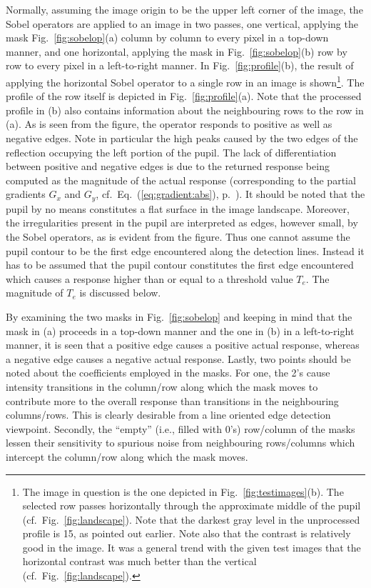 Normally, assuming the image origin to be the upper left corner of the
image, the Sobel operators are applied to an image in two passes, one
vertical, applying the mask Fig.~\ref{fig:sobelop}(a) column by column
to every pixel in a top-down manner, and one horizontal, applying the
mask in Fig.~\ref{fig:sobelop}(b) row by row to every pixel in a
left-to-right manner.  In Fig.~\ref{fig:profile}(b), the result of
applying the horizontal Sobel operator to a single row in an image is
shown\footnote{The image in question is the one depicted in
  Fig.~\ref{fig:testimages}(b).  The selected row passes horizontally
  through the approximate middle of the pupil (cf.\ 
  Fig.~\ref{fig:landscape}).  Note that the darkest gray level in the
  unprocessed profile is 15, as pointed out earlier.  Note also that
  the contrast is relatively good in the image.  It was a general
  trend with the given test images that the horizontal contrast was
  much better than the vertical (cf.\ Fig.~\ref{fig:landscape}).}.
The profile of the row itself is depicted in
Fig.~\ref{fig:profile}(a).  Note that the processed profile in (b)
also contains information about the neighbouring rows to the row in
(a).  As is seen from the figure, the operator responds to positive as
well as negative edges.  Note in particular the high peaks caused by
the two edges of the reflection occupying the left portion of the
pupil.  The lack of differentiation between positive and negative
edges is due to the returned response being computed as the magnitude
of the actual response (corresponding to the partial gradients $G_{x}$
and $G_{y}$, cf.\ Eq.~(\ref{eq:gradient:abs}),
p.~\pageref{eq:gradient:abs}).  It should be noted that the pupil by
no means constitutes a flat surface in the image landscape.  Moreover,
the irregularities present in the pupil are interpreted as edges,
however small, by the Sobel operators, as is evident from the figure.
Thus one cannot assume the pupil contour to be the first edge
encountered along the detection lines.  Instead it has to be assumed
that the pupil contour constitutes the first edge encountered which
causes a response higher than or equal to a threshold value $T_{e}$.
The magnitude of $T_{e}$ is discussed below.

By examining the two masks in Fig.~\ref{fig:sobelop} and keeping in
mind that the mask in (a) proceeds in a top-down manner and the one in
(b) in a left-to-right manner, it is seen that a positive edge causes
a positive actual response, whereas a negative edge causes a negative
actual response.  Lastly, two points should be noted about the
coefficients employed in the masks.  For one, the 2's cause intensity
transitions in the column/row along which the mask moves to contribute
more to the overall response than transitions in the neighbouring
columns/rows.  This is clearly desirable from a line oriented edge
detection viewpoint.  Secondly, the ``empty'' (i.e., filled with 0's)
row/column of the masks lessen their sensitivity to spurious noise
from neighbouring rows/columns which intercept the column/row along
which the mask moves.


